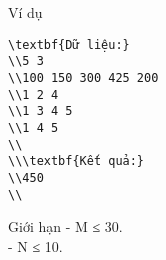 Ví dụ  
\begin{verbatim}
\textbf{Dữ liệu:}
\\5 3
\\100 150 300 425 200
\\1 2 4
\\1 3 4 5
\\1 4 5
\\
\\\textbf{Kết quả:}
\\450
\\\end{verbatim}
   Giới hạn  
- M ≤ 30.   
\\   - N ≤ 10.